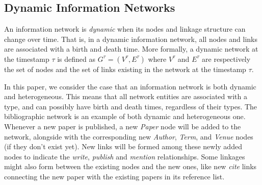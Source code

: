 \subsection{Dynamic Information Networks}
An information network is \emph{dynamic} when its nodes and linkage structure can change over time. That is, in a dynamic information network, all nodes and links are associated with a birth and death time. More formally, a dynamic network at the timestamp $\tau$ is defined as $G^{\tau}=(V^{\tau}, E^{\tau})$ where $V^{\tau}$ and $E^{\tau}$ are respectively the set of nodes and the set of links existing in the network at the timestamp $\tau$.

In this paper, we consider the case that an information network is both dynamic and heterogeneous. This means that all network entities are associated with a type, and can possibly have birth and death times, regardless of their types. The bibliographic network is an example of both dynamic and heterogeneous one. Whenever a new paper is published, a new \emph{Paper} node will be added to the network, alongside with the corresponding new \emph{Author}, \emph{Term}, and \emph{Venue} nodes (if they don't exist yet). New links will be formed among these newly added nodes to indicate the \textit{write}, \textit{publish} and \textit{mention} relationships. Some linkages might also form between the existing nodes and the new ones, like new \textit{cite} links connecting the new paper with the existing papers in its reference list.

